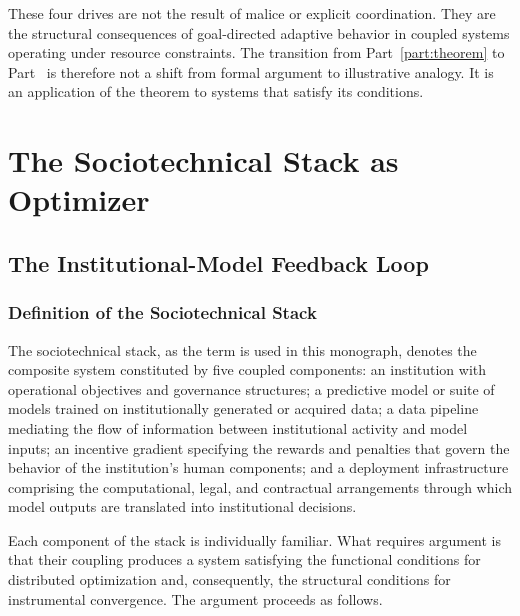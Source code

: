 \documentclass[12pt, oneside]{book}
\theoremstyle{plain}
\theoremstyle{definition}
\theoremstyle{remark}
\theoremstyle{definition}
\begin{document}
These four drives are not the result of malice or explicit coordination. They are
the structural consequences of goal-directed adaptive behavior in coupled systems
operating under resource constraints. The transition from Part~\ref{part:theorem} to
Part~\ref{part:stack} is therefore not a shift from formal argument to illustrative
analogy. It is an application of the theorem to systems that satisfy its conditions.

\part{The Sociotechnical Stack as Optimizer}
\label{part:stack}

\chapter{The Institutional-Model Feedback Loop}
\label{ch:feedbackloop}

\section{Definition of the Sociotechnical Stack}

The sociotechnical stack, as the term is used in this monograph, denotes the
composite system constituted by five coupled components: an institution with
operational objectives and governance structures; a predictive model or suite of
models trained on institutionally generated or acquired data; a data pipeline
mediating the flow of information between institutional activity and model inputs;
an incentive gradient specifying the rewards and penalties that govern the behavior
of the institution's human components; and a deployment infrastructure comprising
the computational, legal, and contractual arrangements through which model outputs
are translated into institutional decisions.

Each component of the stack is individually familiar. What requires argument is
that their coupling produces a system satisfying the functional conditions for
distributed optimization and, consequently, the structural conditions for instrumental
convergence. The argument proceeds as follows.
\end{document}
